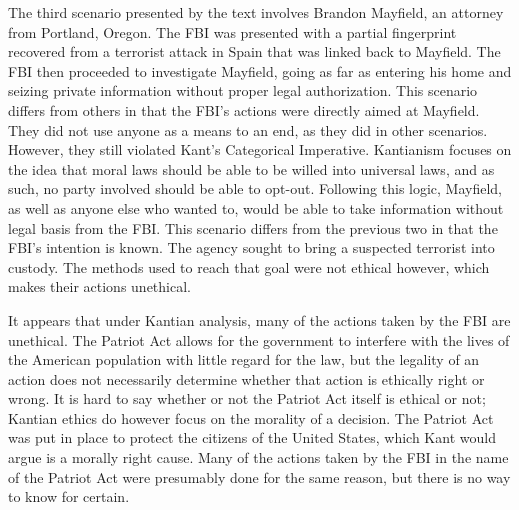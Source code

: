 \documentclass{paper}
\begin{document}
\begin{linenumbers}
The third scenario presented by the text involves Brandon Mayfield, an attorney from Portland, Oregon. The FBI was presented with a partial fingerprint recovered from a terrorist attack in Spain that was linked back to Mayfield. The FBI then proceeded to investigate Mayfield, going as far as entering his home and seizing private information without proper legal authorization. This scenario differs from others in that the FBI's actions were directly aimed at Mayfield. They did not use anyone as a means to an end, as they did in other scenarios. However, they still violated Kant's Categorical Imperative. Kantianism focuses on the idea that moral laws should be able to be willed into universal laws, and as such, no party involved should be able to opt-out. Following this logic, Mayfield, as well as anyone else who wanted to, would be able to take information without legal basis from the FBI. This scenario differs from the previous two in that the FBI's intention is known. The agency sought to bring a suspected terrorist into custody. The methods used to reach that goal were not ethical however, which makes their actions unethical.

It appears that under Kantian analysis, many of the actions taken by the FBI are unethical. The Patriot Act allows for the government to interfere with the lives of the American population with little regard for the law, but the legality of an action does not necessarily determine whether that action is ethically right or wrong. It is hard to say whether or not the Patriot Act itself is ethical or not; Kantian ethics do however focus on the morality of a decision. The Patriot Act was put in place to protect the citizens of the United States, which Kant would argue is a morally right cause. Many of the actions taken by the FBI in the name of the Patriot Act were presumably done for the same reason, but there is no way to know for certain. 
\end{linenumbers}
\newpage
\nocite{*}
\printbibliography
\end{document}
